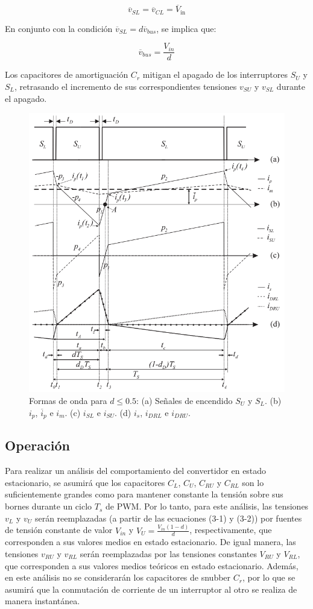 \[
\overline{v}_{SL} = \overline{v}_{CL} = \overline{V}_{\text{in}}
\]

En conjunto con la condición \(\overline{v}_{SL} = d\overline{v}_{bus}\), se implica que:

\[
\overline{v}_{bus} = \frac{V_{in}}{d}
\]

Los capacitores de amortiguación \( C_r \) mitigan el apagado de los interruptores \( S_U \) y \( S_L \), retrasando el incremento de sus correspondientes tensiones \( v_{SU} \) y \( v_{SL} \) durante el apagado.

\begin{figure}
	\centering
	\includegraphics[width=0.7\linewidth]{img/formaOnda1}
	\caption{Formas de onda para \( d \leq 0.5 \): (a) Señales de encendido \( S_U \) y \( S_L \). (b) \( i_p \), \( \overline{i}_p \) e \( i_m \). (c) \( i_{SL} \) e \( i_{SU} \). (d) \( i_s \), \( i_{DRL} \) e \( i_{DRU} \).}
	\label{fig:formaonda1}
\end{figure}

\subsection{Operación}

Para realizar un análisis del comportamiento del convertidor en estado estacionario, se asumirá que los capacitores \( C_L \), \( C_U \), \( C_{RU} \) y \( C_{RL} \) son lo suficientemente grandes como para mantener constante la tensión sobre sus bornes durante un ciclo \( T_s \) de PWM. Por lo tanto, para este análisis, las tensiones \( v_L \) y \( v_U \) serán reemplazadas (a partir de las ecuaciones (3-1) y (3-2)) por fuentes de tensión constante de valor \( V_{in} \) y \( V_U = \frac{V_{in}(1 - d)}{d} \), respectivamente, que corresponden a sus valores medios en estado estacionario. De igual manera, las tensiones \( v_{RU} \) y \( v_{RL} \) serán reemplazadas por las tensiones constantes \( V_{RU} \) y \( V_{RL} \), que corresponden a sus valores medios teóricos en estado estacionario. Además, en este análisis no se considerarán los capacitores de snubber \( C_r \), por lo que se asumirá que la conmutación de corriente de un interruptor al otro se realiza de manera instantánea.

